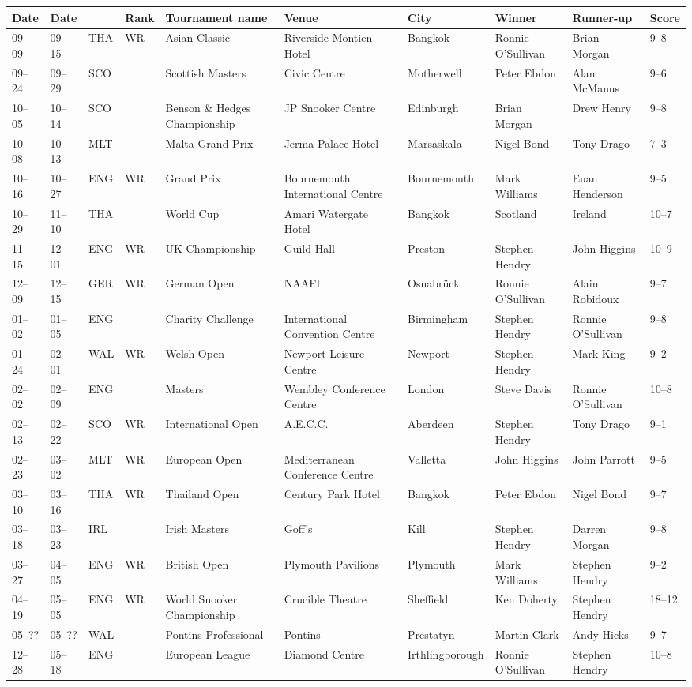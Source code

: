 \documentclass{article}
\begin{document}
\begin{tabular}{llllllllll}
\toprule
Date & Date &  & Rank & Tournament name & Venue & City & Winner & Runner-up & Score \\
\midrule
09–09 & 09–15 & THA & WR & Asian Classic & Riverside Montien Hotel & Bangkok & Ronnie O'Sullivan & Brian Morgan & 9–8 \\
09–24 & 09–29 & SCO &  & Scottish Masters & Civic Centre & Motherwell & Peter Ebdon & Alan McManus & 9–6 \\
10–05 & 10–14 & SCO &  & Benson \& Hedges Championship & JP Snooker Centre & Edinburgh & Brian Morgan & Drew Henry & 9–8 \\
10–08 & 10–13 & MLT &  & Malta Grand Prix & Jerma Palace Hotel & Marsaskala & Nigel Bond & Tony Drago & 7–3 \\
10–16 & 10–27 & ENG & WR & Grand Prix & Bournemouth International Centre & Bournemouth & Mark Williams & Euan Henderson & 9–5 \\
10–29 & 11–10 & THA &  & World Cup & Amari Watergate Hotel & Bangkok & Scotland & Ireland & 10–7 \\
11–15 & 12–01 & ENG & WR & UK Championship & Guild Hall & Preston & Stephen Hendry & John Higgins & 10–9 \\
12–09 & 12–15 & GER & WR & German Open & NAAFI & Osnabrück & Ronnie O'Sullivan & Alain Robidoux & 9–7 \\
01–02 & 01–05 & ENG &  & Charity Challenge & International Convention Centre & Birmingham & Stephen Hendry & Ronnie O'Sullivan & 9–8 \\
01–24 & 02–01 & WAL & WR & Welsh Open & Newport Leisure Centre & Newport & Stephen Hendry & Mark King & 9–2 \\
02–02 & 02–09 & ENG &  & Masters & Wembley Conference Centre & London & Steve Davis & Ronnie O'Sullivan & 10–8 \\
02–13 & 02–22 & SCO & WR & International Open & A.E.C.C. & Aberdeen & Stephen Hendry & Tony Drago & 9–1 \\
02–23 & 03–02 & MLT & WR & European Open & Mediterranean Conference Centre & Valletta & John Higgins & John Parrott & 9–5 \\
03–10 & 03–16 & THA & WR & Thailand Open & Century Park Hotel & Bangkok & Peter Ebdon & Nigel Bond & 9–7 \\
03–18 & 03–23 & IRL &  & Irish Masters & Goff's & Kill & Stephen Hendry & Darren Morgan & 9–8 \\
03–27 & 04–05 & ENG & WR & British Open & Plymouth Pavilions & Plymouth & Mark Williams & Stephen Hendry & 9–2 \\
04–19 & 05–05 & ENG & WR & World Snooker Championship & Crucible Theatre & Sheffield & Ken Doherty & Stephen Hendry & 18–12 \\
05–?? & 05–?? & WAL &  & Pontins Professional & Pontins & Prestatyn & Martin Clark & Andy Hicks & 9–7 \\
12–28 & 05–18 & ENG &  & European League & Diamond Centre & Irthlingborough & Ronnie O'Sullivan & Stephen Hendry & 10–8 \\
\bottomrule
\end{tabular}
\end{document}
